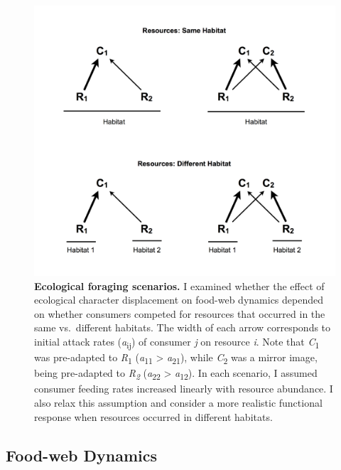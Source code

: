 \documentclass[11pt,]{article}
\begin{document}
\begin{figure}
\centering
\includegraphics{Fig_1_ForagingScenarios}
\caption{\label{fig:foraging_scenarios}\textbf{Ecological foraging
scenarios.} I examined whether the effect of ecological character
displacement on food-web dynamics depended on whether consumers competed
for resources that occurred in the same vs.~different habitats. The
width of each arrow corresponds to initial attack rates
(\emph{a}\textsubscript{ij}) of consumer \emph{j} on resource \emph{i}.
Note that \emph{C}\textsubscript{1} was pre-adapted to
\emph{R}\textsubscript{1} (\emph{a}\textsubscript{11} \textgreater{}
\emph{a}\textsubscript{21}), while \emph{C}\textsubscript{2} was a
mirror image, being pre-adapted to \emph{R\textsubscript{2}}
(\emph{a}\textsubscript{22} \textgreater{} \emph{a}\textsubscript{12}).
In each scenario, I assumed consumer feeding rates increased linearly
with resource abundance. I also relax this assumption and consider a
more realistic functional response when resources occurred in different
habitats.}
\end{figure}

\subsection{Food-web Dynamics}\label{food-web-dynamics}
\end{document}
